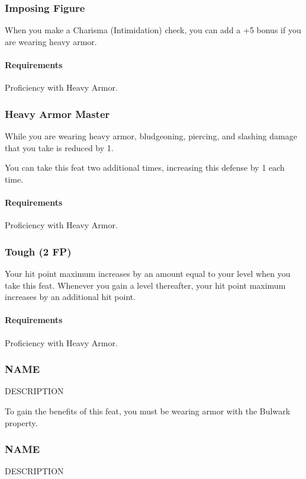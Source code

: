 \subsubsection{Imposing Figure} \label{feat::imposingfigure}
    When you make a Charisma (Intimidation) check, you can add a +5 bonus if you are wearing heavy armor.
    \paragraph{Requirements} Proficiency with Heavy Armor.
\subsubsection{Heavy Armor Master} \label{feat::heavyarmormaster}
    While you are wearing heavy armor, bludgeoning, piercing, and slashing damage that you take is reduced by 1.

    You can take this feat two additional times, increasing this defense by 1 each time.
    \paragraph{Requirements} Proficiency with Heavy Armor.
\subsubsection{Tough (2 FP)} \label{feat::tough}
    Your hit point maximum increases by an amount equal to your level when you take this feat.
    Whenever you gain a level thereafter, your hit point maximum increases by an additional hit point.
    \paragraph{Requirements} Proficiency with Heavy Armor.

\subsubsection{NAME} \label{feat::name}
    DESCRIPTION

    To gain the benefits of this feat, you must be wearing armor with the Bulwark property.
\subsubsection{NAME} \label{feat::name}
    DESCRIPTION

